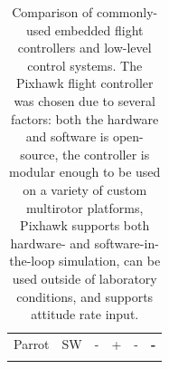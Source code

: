 \documentclass[a4paper,11pt,twoside,openright]{book}
\begin{document}
\begin{table}
\begin{tabular}{c||c|c|c|c|c}
    \scriptsize Parrot           & \scriptsize SW                             & \scriptsize -                            & \scriptsize +                           & \scriptsize -          & \scriptsize \textbf{-}                       \\
    \noalign{\smallskip}\hline
  \end{tabular}
  \caption{Comparison of commonly-used embedded flight controllers and low-level control systems. The Pixhawk flight controller was chosen due to several factors: both the hardware and software is open-source, the controller is modular enough to be used on a variety of custom multirotor platforms, Pixhawk supports both hardware- and software-in-the-loop simulation, can be used outside of laboratory conditions, and supports attitude rate input.\label{tab:embedded_flight_controllers}}
\end{table}


\end{document}
